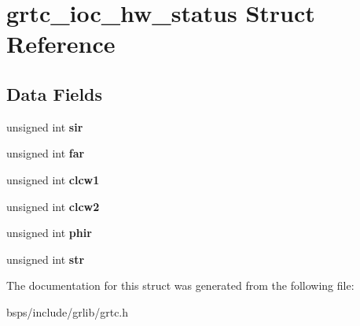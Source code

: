 \hypertarget{structgrtc__ioc__hw__status}{}\section{grtc\+\_\+ioc\+\_\+hw\+\_\+status Struct Reference}
\label{structgrtc__ioc__hw__status}
\subsection*{Data Fields}
\begin{DoxyCompactItemize}
\item 
\mbox{\label{structgrtc__ioc__hw__status_ae6b153b1d8deb69a0174456907b2583a}} 
unsigned int {\bfseries sir}
\item 
\mbox{\label{structgrtc__ioc__hw__status_a04606f6c2ef24734d9f237cb20f8c074}} 
unsigned int {\bfseries far}
\item 
\mbox{\label{structgrtc__ioc__hw__status_aa03104a3c53ee9c74da4a229e5319d1c}} 
unsigned int {\bfseries clcw1}
\item 
\mbox{\label{structgrtc__ioc__hw__status_a8c36f6f897aeb298123518a6cdc59cb4}} 
unsigned int {\bfseries clcw2}
\item 
\mbox{\label{structgrtc__ioc__hw__status_a31a671113a8184869c65691efa27eef3}} 
unsigned int {\bfseries phir}
\item 
\mbox{\label{structgrtc__ioc__hw__status_ad237f4e5d3ab634b0d20b74be66a48af}} 
unsigned int {\bfseries str}
\end{DoxyCompactItemize}


The documentation for this struct was generated from the following file\+:\begin{DoxyCompactItemize}
\item 
bsps/include/grlib/grtc.\+h\end{DoxyCompactItemize}
